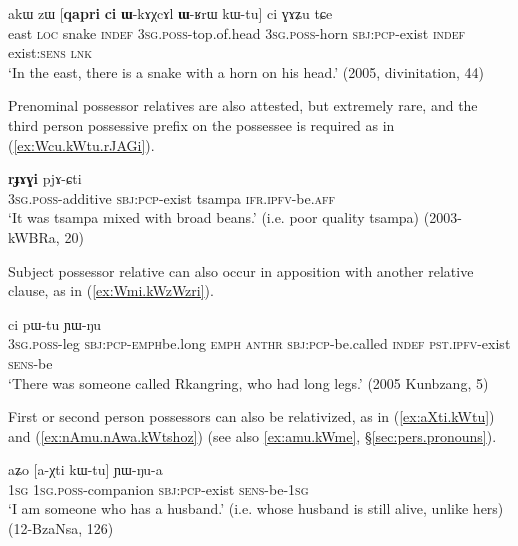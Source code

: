\begin{exe}
\ex \label{ex:qapri.WrW.kWtu}
\gll  akɯ zɯ [\textbf{qapri} \textbf{ci} \textbf{ɯ}-kɤχcɤl \textbf{ɯ}-ʁrɯ kɯ-tu] ci ɣɤʑu tɕe \\
east \textsc{loc} snake \textsc{indef} \textsc{3sg}.\textsc{poss}-top.of.head \textsc{3sg}.\textsc{poss}-horn \textsc{sbj}:\textsc{pcp}-exist \textsc{indef} exist:\textsc{sens} \textsc{lnk} \\
\glt `In the east, there is a snake with a horn on his head.' (2005, divinitation, 44)
\end{exe}

 
Prenominal possessor relatives are also attested, but extremely rare, and the third person possessive prefix on the possessee is required as in (\ref{ex:Wcu.kWtu.rJAGi}).

\begin{exe}
\ex \label{ex:Wcu.kWtu.rJAGi}
\gll  [\textbf{ɯ}-cu kɯ-tu] \textbf{rɟɤɣi} pjɤ-ɕti \\
\textsc{3sg}.\textsc{poss}-additive \textsc{sbj}:\textsc{pcp}-exist tsampa \textsc{ifr}.\textsc{ipfv}-be.\textsc{aff} \\
\glt `It was tsampa mixed with broad beans.' (i.e. poor quality tsampa) (2003-kWBRa, 20)
 \end{exe}

Subject possessor relative can also occur in apposition with another relative clause, as in (\ref{ex:Wmi.kWzWzri}).

\begin{exe}
 \ex \label{ex:Wmi.kWzWzri}
  ci pɯ-tu ɲɯ-ŋu \\
 \textsc{3sg}.\textsc{poss}-leg \textsc{sbj}:\textsc{pcp}-\textsc{emph}\redp{}be.long \textsc{emph}  \textsc{anthr} \textsc{sbj}:\textsc{pcp}-be.called \textsc{indef} \textsc{pst}.\textsc{ipfv}-exist \textsc{sens}-be \\
 \glt `There was someone called Rkangring, who had long legs.' (2005 Kunbzang, 5)
 \end{exe}

First or second person possessors can also be relativized, as in (\ref{ex:aXti.kWtu}) and (\ref{ex:nAmu.nAwa.kWtshoz}) (see also \ref{ex:amu.kWme}, §\ref{sec:pers.pronouns}).

\begin{exe}
\ex \label{ex:aXti.kWtu}
\gll aʑo [a-χti kɯ-tu] ɲɯ-ŋu-a \\
\textsc{1sg} \textsc{1sg}.\textsc{poss}-companion \textsc{sbj}:\textsc{pcp}-exist \textsc{sens}-be-\textsc{1sg} \\
\glt `I am someone who has a husband.' (i.e. whose husband is still alive, unlike hers) (12-BzaNsa, 126)
\end{exe}

